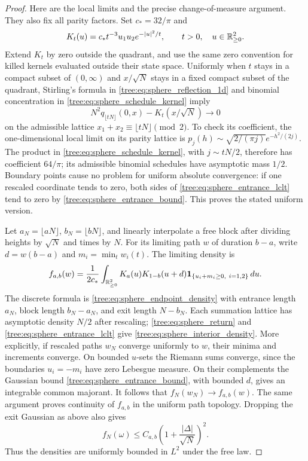\begin{proof}
Here are the local limits and the precise change-of-measure argument.
They also fix all parity factors.  Set $c_*=32/\pi$ and
\[
 K_t(u)=c_* t^{-3}u_1u_2e^{-|u|^2/t},\qquad t>0,\quad u\in\mathbb R_{\geq0}^2.
\]
Extend $K_t$ by zero outside the quadrant, and use the same zero
convention for killed kernels evaluated outside their state space.
Uniformly when $t$ stays in a compact subset of $(0,\infty)$ and $x/\sqrt N$
stays in a fixed compact subset of the quadrant, Stirling's formula in
\eqref{tree:eq:sphere_reflection_1d} and binomial concentration in
\eqref{tree:eq:sphere_schedule_kernel} imply
\begin{equation}\label{tree:eq:sphere_entrance_lclt}
 N^2q_{\lfloor tN\rfloor}(0,x)-K_t(x/\sqrt N)\longrightarrow0
\end{equation}
on the admissible lattice $x_1+x_2\equiv\lfloor tN\rfloor\pmod2$.
To check its coefficient, the one-dimensional local limit on its parity
lattice is $p_j(h)\sim\sqrt{2/(\pi j)}e^{-h^2/(2j)}$.
The product in \eqref{tree:eq:sphere_schedule_kernel}, with $j\sim tN/2$,
therefore has coefficient $64/\pi$; its admissible binomial schedules
have asymptotic mass $1/2$.  Boundary points cause no problem for uniform
absolute convergence: if one rescaled coordinate tends to zero, both
sides of \eqref{tree:eq:sphere_entrance_lclt} tend to zero by
\eqref{tree:eq:sphere_entrance_bound}.  This proves the stated uniform version.

Let $a_N=\lfloor aN\rfloor$, $b_N=\lfloor bN\rfloor$, and linearly
interpolate a free block after dividing heights by $\sqrt N$ and times
by $N$.  For its limiting path $w$ of duration $b-a$, write
$d=w(b-a)$ and $m_i=\min_t w_i(t)$.  The limiting density is
\begin{equation}\label{tree:eq:sphere_interior_density}
 f_{a,b}(w)=\frac1{2c_*}\int_{\mathbb R_{\geq0}^2}
 K_a(u)K_{1-b}(u+d)
       \mathbf1_{\{u_i+m_i\geq0,\ i=1,2\}}\,du.
\end{equation}
The discrete formula is \eqref{tree:eq:sphere_endpoint_density} with entrance
length $a_N$, block length $b_N-a_N$, and exit length $N-b_N$.
Each summation lattice has asymptotic density $N/2$ after rescaling;
\eqref{tree:eq:sphere_return} and \eqref{tree:eq:sphere_entrance_lclt} give
\eqref{tree:eq:sphere_interior_density}.  More explicitly, if rescaled paths
$w_N$ converge uniformly to $w$, their minima and increments converge.
On bounded $u$-sets the Riemann sums converge, since the boundaries
$u_i=-m_i$ have zero Lebesgue measure.  On their complements the Gaussian
bound \eqref{tree:eq:sphere_entrance_bound}, with bounded $d$, gives an
integrable common majorant.  It follows that $f_N(w_N)\to f_{a,b}(w)$.
The same argument proves continuity of $f_{a,b}$ in the uniform path
topology.  Dropping the exit Gaussian as above also gives
\[
 f_N(\omega)\leq C_{a,b}\left(1+\frac{|\Delta|}{\sqrt N}\right)^2.
\]
Thus the densities are uniformly bounded in $L^2$ under the free law.


\end{proof}

